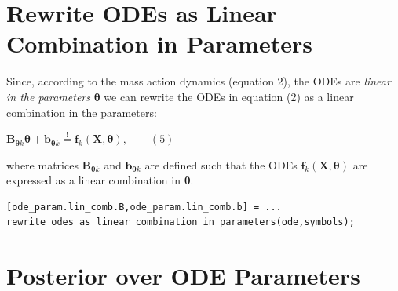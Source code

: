 \begin{par}
\section{Rewrite ODEs as Linear Combination in Parameters}

\begin{par}
Since, according to the mass action dynamics (equation 2), the ODEs are \textit{linear in the parameters} $\boldsymbol\theta$ we can rewrite the ODEs in equation (2) as a linear combination in the parameters:
\end{par} \vspace{1em}
\begin{par}
$\mathbf{B}_{\boldsymbol{\theta} k} \boldsymbol{\theta} + \mathbf{b}_{\boldsymbol{\theta} k} \stackrel{!}{=}\mathbf{f}_k(\mathbf{X},\boldsymbol{\theta}), \qquad (5)$
\end{par} \vspace{1em}
\begin{par}
where matrices $\mathbf{B}_{\boldsymbol{\theta} k}$ and $\mathbf{b}_{\boldsymbol{\theta} k}$ are defined such that the ODEs $\mathbf{f}_k(\mathbf{X},\boldsymbol{\theta})$ are expressed as a linear combination in $\boldsymbol{\theta}$.
\end{par} \vspace{1em}
\color{RoyalPurple}\begin{verbatim}
[ode_param.lin_comb.B,ode_param.lin_comb.b] = ...
rewrite_odes_as_linear_combination_in_parameters(ode,symbols);
\end{verbatim} 
\color{black}


\section{Posterior over ODE Parameters}


\end{par}

